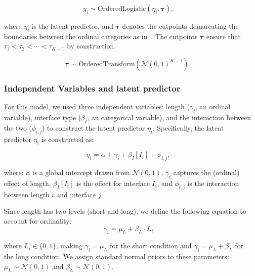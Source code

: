 \begin{equation}
    y_i \sim \text{OrderedLogistic}(\eta_i, \boldsymbol{\tau}),
    \label{eq:cog_main}
\end{equation}

where $\eta_i$ is the latent predictor, and $\boldsymbol{\tau}$ denotes the cutpoints demarcating the boundaries between the ordinal categories as in~. The cutpoints $\boldsymbol{\tau}$ ensure that $\tau_1 < \tau_2 < \cdots < \tau_{K-1}$ by construction.

\begin{equation}
    \boldsymbol{\tau} \sim \text{OrderedTransform}(\mathcal{N}(0, 1)^{K-1}),
    \label{eq:cog_orderedTransfrom}
\end{equation}

\subsubsection{Independent Variables and latent predictor}
For this model, we used three independent variables: length ($\gamma_i$, an ordinal variable), interface type ($\beta_I$, an categorical variable), and the interaction between the two ($\phi_{i,j}$) to construct the latent predictor $\eta_i$. Specifically, the latent predictor $\eta_i$ is constructed as:

\begin{equation}
    \eta_i = \alpha + \gamma_i + \beta_I[I_i] + \phi_{i,j},
    \label{eq:cog_regression}
\end{equation}

where: $\alpha$ is a global intercept drawn from $\mathcal{N}(0,1)$, $\gamma_i$ captures the (ordinal) effect of length, $\beta_I[I_i]$ is the effect for interface $I_i$, and $\phi_{i,j}$ is the interaction between length $i$ and interface $j$. 

Since length has two levels (short and long), we define the following equation to account for ordinality:
\begin{equation}
    \gamma_i = \mu_L + \beta_L \cdot L_i
    \label{eq:cog_ordinal}
\end{equation}

where $L_i \in \{0,1\}$, making $\gamma_i = \mu_L$ for the short condition and $\gamma_i = \mu_L + \beta_L$ for the long condition. We assign standard normal priors to these parameters: $\mu_L \sim \mathcal{N}(0,1)$ and $\beta_L \sim \mathcal{N}(0,1)$. 

